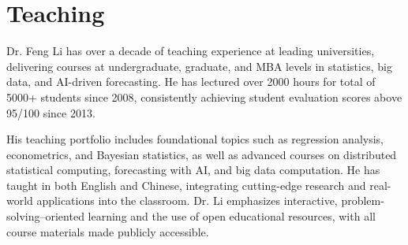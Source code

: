 \documentclass[twoside,a4paper]{article}
\begin{document}
\newpage
\section{Teaching}

Dr. Feng Li has over a decade of teaching experience at leading universities, delivering courses at undergraduate, graduate, and MBA levels in statistics, big data, and AI-driven forecasting. He has lectured over 2000 hours for total of 5000+ students since 2008, consistently achieving student evaluation scores above 95/100 since 2013.

His teaching portfolio includes foundational topics such as regression analysis, econometrics, and Bayesian statistics, as well as advanced courses on distributed statistical computing, forecasting with AI, and big data computation. He has taught in both English and Chinese, integrating cutting-edge research and real-world applications into the classroom. Dr. Li emphasizes interactive, problem-solving–oriented learning and the use of open educational resources, with all course materials made publicly accessible.
\end{document}
